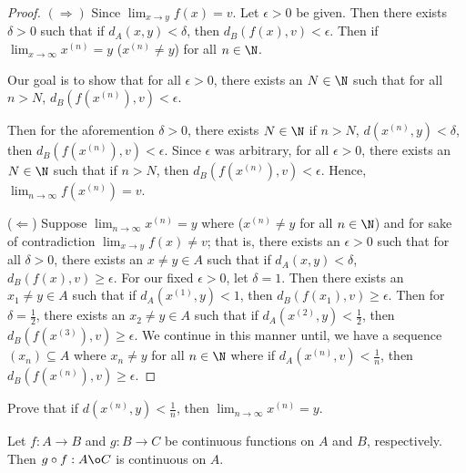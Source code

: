 \begin{proof}
\( (\Longrightarrow) \) Since \( \lim_{ x \to y }  f(x) = v  \). Let \( \epsilon > 0  \) be given. Then there exists \( \delta > 0  \) such that if \( {d}_{A}(x,y) < \delta \), then
\( {d}_{B}(f(x), v) < \epsilon \). Then if \( \lim_{ x \to \infty  }  x^{(n)}  = y  \) (\( x^{(n)} \neq y   \)) for all \( n \in \N  \).

\begin{center}
 Our goal is to show that for all \( \epsilon > 0  \), there exists an \( N \in \N  \) such that for all \( n > N  \), \( {d}_{B}(f(x^{(n)}), v) < \epsilon \).   
\end{center}
  Then for the aforemention \( \delta > 0  \), there exists \( N \in \N  \) if \( n > N  \), \( d(x^{(n)},y) < \delta \), then \( {d}_{B}(f(x^{(n)}), v) < \epsilon \). Since \( \epsilon  \) was arbitrary, for all \( \epsilon > 0  \), there exists an \( N \in \N  \) such that if \( n > N  \), then \( {d}_{B}(f(x^{(n)}), v) < \epsilon \). Hence, \( \lim_{ n \to \infty  }  f(x^{(n)}) = v  \).

  (\( \Longleftarrow \)) Suppose \( \lim_{ n \to \infty  }  x^{(n)} = y  \) where (\( x^{(n)} \neq y  \) for all \( n \in \N \)) and for sake of contradiction \( \lim_{ x \to y }  f(x) \neq v  \); that is, there exists an \( \epsilon > 0  \) such that for all \( \delta > 0  \), there exists an \( x \neq y  \in A  \) such that if \( {d}_{A}(x,y) < \delta \), \( {d}_{B}(f(x), v) \geq \epsilon \). For our fixed \( \epsilon > 0  \), let \( \delta = 1   \). Then there exists an \( {x}_{1} \neq y \in A  \) such that if \( {d}_{A}(x^{(1)}, y) < 1 \), then \( {d}_{B}(f({x}_{1}), v) \geq \epsilon \). Then for \( \delta = \frac{ 1 }{ 2 }   \), there exists an \( {x}_{2} \neq y  \in A  \) such that if \( {d}_{A}(x^{(2)}, y) < \frac{ 1 }{ 2 } \), then \( {d}_{B}(f(x^{(3)}), v) \geq \epsilon \). We continue in this manner until, we have a sequence \( ({x}_{n}) \subseteq  A  \) where \( {x}_{n} \neq y  \) for all \( n \in \N  \) where if \( {d}_{A}(x^{(n)}, v) < \frac{ 1 }{ n }  \), then \( {d}_{B}(f(x^{(n)}), v) \geq \epsilon \).  
\end{proof}

\begin{prop}
   Prove that if \( d(x^{(n)},y) < \frac{ 1 }{ n }  \), then \( \lim_{ n \to \infty  }  x^{(n)} = y  \).
\end{prop}

\begin{prop}[Redo]
   Let \( f: A \to B  \) and \( g : B \to C  \) be continuous functions on \( A  \) and \( B  \), respectively. Then \( g \circ f : A \o C   \) is continuous on \( A  \).
\end{prop}

